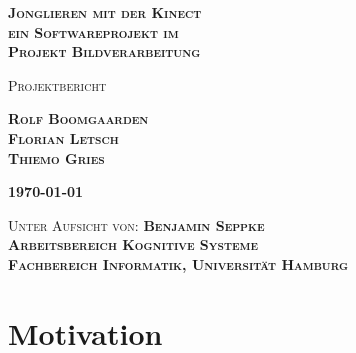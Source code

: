 \documentclass[12pt,a4paper,ngerman]{scrartcl}
\begin{document}
\begin{titlepage}

\vspace*{3 cm}

\begin{flushright}
\bfseries{\Huge\scshape Jonglieren mit der Kinect\\{\Large ein Softwareprojekt im}\\Projekt Bildverarbeitung}
\end{flushright}

\vspace{2 cm}

\begin{flushright}
\scshape{\large Projektbericht}
\end{flushright}

\begin{flushright}
\scshape{\LARGE\bfseries Rolf Boomgaarden\\}
\scshape{\LARGE\bfseries Florian Letsch\\}
\scshape{\LARGE\bfseries Thiemo Gries\\}
\end{flushright}

\vspace{2 cm}

\begin{flushright}
\scshape{\large\bfseries \today}
\end{flushright}

\vfill

\begin{flushright}

\scshape{Unter Aufsicht von: {\bfseries Benjamin Seppke}\\}
\scshape{\bfseries Arbeitsbereich Kognitive Systeme\\}
\scshape{\bfseries Fachbereich Informatik, Universität Hamburg\\}
\end{flushright}

\end{titlepage}

\tableofcontents
\newpage



\section{Motivation}
\end{document}
